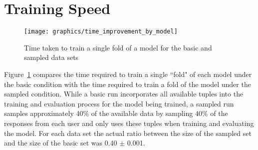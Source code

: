 \documentclass[letterpaper, 12pt, captions=tableabove]{scrreprt}
\begin{document}
	\section{Training Speed}
	\label{sec:trainingSpeed}
		\begin{figure}[htbp]
			\centering
			\texttt{[image: graphics/time\_improvement\_by\_model]}
 			\captionsetup{justification=centering}
			\caption{Time taken to train a single fold of a model for the basic and sampled data sets}
			\label{fig:timeImprovemnt}
		\end{figure}

		Figure~\ref{fig:timeImprovemnt} compares the time required to train a single ``fold" of each model under the basic condition with the time required to train a fold of the model under the sampled condition. While a basic run incorporates all available tuples into the training and evaluation process for the model being trained, a sampled run samples approximately 40\% of the available data by sampling 40\% of the responses from each user and only uses these tuples when training and evaluating the model. For each data set the actual ratio between the size of the sampled set and the size of the basic set was 0.40 $\pm$ 0.001.
	
\end{document}
